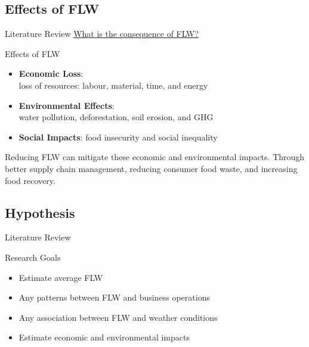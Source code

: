 \documentclass{beamer}\usepackage[]{graphicx}\usepackage[]{xcolor}
\begin{document}
\subsection{Effects of FLW}
\begin{frame}{Literature Review}
    \underline{What is the consequence of FLW?}
    \begin{block}{Effects of FLW}
        \begin{itemize}
            \item \textbf{Economic Loss}:\\
             loss of resources: labour, material, time, and energy
            \item \textbf{Environmental Effects}:\\
            water pollution, deforestation, soil erosion, and GHG
            \item \textbf{Social Impacts}: food insecurity and social inequality\\    
        \end{itemize}
    \end{block}

Reducing FLW can mitigate these economic and environmental impacts.
Through better supply chain management, reducing consumer food waste,
and increasing food recovery.

\end{frame}

\subsection{Hypothesis}
\begin{frame}{Literature Review}
    \begin{block}{Research Goals}
        \begin{itemize}
            \item Estimate average FLW
            \item Any patterns between FLW and business operations
            \item Any association between FLW and weather conditions
            \item Estimate economic and environmental impacts
        \end{itemize}
    \end{block}
\end{frame}

\end{document}
